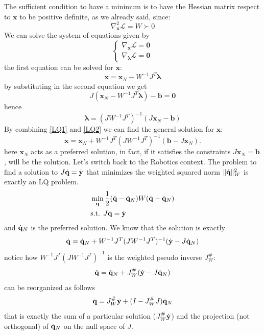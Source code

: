 \documentclass[10pt, a4paper]{report}
\begin{document}
The sufficient condition to have a minimum is to have the Hessian matrix respect to $\mathbf x$ to be positive definite, as we already said, since:\begin{equation}
    \nabla_{\mathbf x}^2\mathcal L=W\succ 0
\end{equation}
We can solve the system of equations given by \begin{equation}
    \begin{cases}
        \nabla_{\mathbf x}\mathcal L=\mathbf 0\\ 
        \nabla_{\boldsymbol{\lambda}}\mathcal L=\mathbf 0
    \end{cases}
\end{equation}
the first equation can be solved for $\mathbf x$:\begin{equation}\label{LQ1}
    \mathbf x=\mathbf x_N-W^{-1}J^T\boldsymbol{\lambda}
\end{equation}
by substituting in the second equation we get\begin{equation}
    J(\mathbf x_N-W^{-1}J^T\boldsymbol{\lambda})-\mathbf b=\mathbf 0
\end{equation}
hence\begin{equation}\label{LQ2}
    \boldsymbol{\lambda}=(JW^{-1}J^T)^{-1}(J\mathbf x_N-\mathbf b)
\end{equation}
By combining \eqref{LQ1} and \eqref{LQ2} we can find the general solution for $\mathbf x$:\begin{equation}
    \mathbf x=\mathbf x_N+W^{-1}J^T(JW^{-1}J^T)^{-1}(\mathbf b-J\mathbf x_N).
\end{equation}
here $\mathbf x_N$ acts as a preferred solution, in fact, if it satisfies the constraints $J\mathbf x_N=\mathbf b$, will be the solution. Let's switch back to the Robotics context. The problem to find a solution to $J{\dot{\mathbf q}}={\dot{\mathbf y}}$ that minimizes the weighted squared norm $\|{\dot{\mathbf q}}\|_W^2$ is exactly an LQ problem.\begin{align*}
    &\min_{{\dot{\mathbf q}}} \frac{1}{2}({\dot{\mathbf q}}-{\dot{\mathbf q}}_N)W({\dot{\mathbf q}}-{\dot{\mathbf q}}_N)\\ 
    &\text{s.t. } J{\dot{\mathbf q}}={\dot{\mathbf y}}
\end{align*}
and ${\dot{\mathbf q}}_N$ is the preferred solution. We know that the solution is exactly\begin{equation}
   {\dot{\mathbf q}}= {\dot{\mathbf q}}_N+W^{-1}J^T(JW^{-1}J^T)^{-1}({\dot{\mathbf y}}-J{\dot{\mathbf q}}_N)
\end{equation}
notice how $W^{-1}J^T(JW^{-1}J^T)^{-1}$ is the weighted pseudo inverse $J^\#_W$:
\begin{equation}
   {\dot{\mathbf q}}= {\dot{\mathbf q}}_N+J^\#_W({\dot{\mathbf y}}-J{\dot{\mathbf q}}_N)
\end{equation}
can be reorganized as follows
\begin{equation}
   {\dot{\mathbf q}}= J^\#_W{\dot{\mathbf y}}+(I-J^\#_WJ){\dot{\mathbf q}}_N 
\end{equation}
that is exactly the sum of a particular solution ($J^\#_W{\dot{\mathbf y}}$) and the projection (not orthogonal) of ${\dot{\mathbf q}}_N$ on the null space of $J$.
\bigskip 
\end{document}
